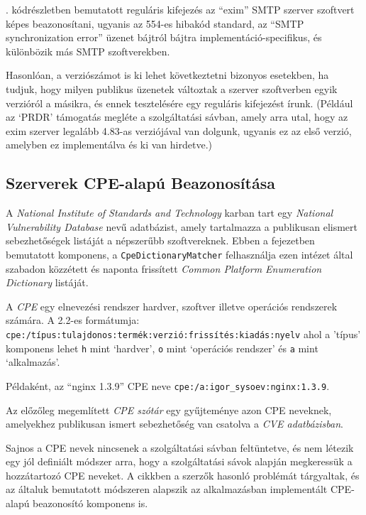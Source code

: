 	\Az{\ref{eximregex}}. kódrészletben bemutatott reguláris kifejezés az ``exim'' SMTP szerver szoftvert képes beazonosítani, ugyanis az 554-es hibakód standard, az ``SMTP synchronization error'' üzenet bájtról bájtra implementáció-specifikus, és különbözik más SMTP szoftverekben.
	
	Hasonlóan, a verziószámot is ki lehet következtetni bizonyos esetekben, ha tudjuk, hogy milyen publikus üzenetek változtak a szerver szoftverben egyik verzióról a másikra, és ennek tesztelésére egy reguláris kifejezést írunk. (Például az `PRDR' támogatás megléte a szolgáltatási sávban, amely arra utal, hogy az exim szerver legalább 4.83-as verziójával van dolgunk, ugyanis ez az első verzió, amelyben ez implementálva és ki van hirdetve.)

\subsection*{Szerverek CPE-alapú Beazonosítása} \label{ssec:matchcpe}

	A \textit{National Institute of Standards and Technology} karban tart egy \textit{National Vulnerability Database} nevű adatbázist, amely tartalmazza a publikusan elismert sebezhetőségek listáját a népszerűbb szoftvereknek. Ebben a fejezetben bemutatott komponens, a \texttt{CpeDictionaryMatcher} felhasználja ezen intézet által szabadon közzétett és naponta frissített \textit{Common Platform Enumeration Dictionary} listáját.
	
	A \textit{CPE} egy elnevezési rendszer hardver, szoftver illetve operációs rendszerek számára\cite{cpe22}. A 2.2-es formátumja: \texttt{cpe:/típus:tulajdonos:termék:verzió:frissítés:kiadás:nyelv} ahol a 'típus' komponens lehet \texttt{h} mint `hardver', \texttt{o} mint `operációs rendszer' és \texttt{a} mint `alkalmazás'.
	
	Példaként, az ``nginx 1.3.9'' CPE neve \texttt{cpe:/a:igor_sysoev:nginx:1.3.9}.
	
	Az előzőleg megemlített \textit{CPE szótár} egy gyűjteménye azon CPE neveknek, amelyekhez publikusan ismert sebezhetőség van csatolva a \textit{CVE adatbázisban}.
	
	Sajnos a CPE nevek nincsenek a szolgáltatási sávban feltüntetve, és nem létezik egy jól definiált módszer arra, hogy a szolgáltatási sávok alapján megkeressük a hozzátartozó CPE neveket. A \cite{shovat15} cikkben a szerzők hasonló problémát tárgyaltak, és az általuk bemutatott módszeren alapszik az alkalmazásban implementált CPE-alapú beazonosító komponens is.
	
